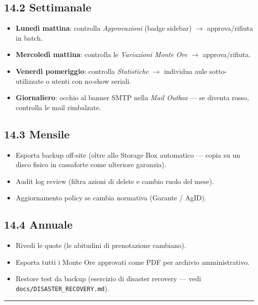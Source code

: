\documentclass[11pt,a4paper]{article}
\begin{document}
\subsection{14.2 Settimanale}


\begin{itemize}
  \item \textbf{Lunedì mattina}: controlla \textit{Approvazioni} (badge sidebar) $\rightarrow$ approva/rifiuta in batch.
  \item \textbf{Mercoledì mattina}: controlla le \textit{Variazioni Monte Ore} $\rightarrow$ approva/rifiuta.
  \item \textbf{Venerdì pomeriggio}: controlla \textit{Statistiche} $\rightarrow$ individua aule sotto-utilizzate o utenti con no-show seriali.
  \item \textbf{Giornaliero}: occhio al banner SMTP nella \textit{Mail Outbox} --- se diventa rosso, controlla le mail rimbalzate.
\end{itemize}

\subsection{14.3 Mensile}


\begin{itemize}
  \item Esporta backup off-site (oltre allo Storage Box automatico --- copia su un disco fisico in cassaforte come ulteriore garanzia).
  \item Audit log review (filtra azioni di delete e cambio ruolo del mese).
  \item Aggiornamento policy se cambia normativa (Garante / AgID).
\end{itemize}

\subsection{14.4 Annuale}


\begin{itemize}
  \item Rivedi le quote (le abitudini di prenotazione cambiano).
  \item Esporta tutti i Monte Ore approvati come PDF per archivio amministrativo.
  \item Restore test da backup (esercizio di disaster recovery --- vedi \texttt{docs/DISASTER\_RECOVERY.md}).
\end{itemize}

\medskip\hrule\medskip
\end{document}
